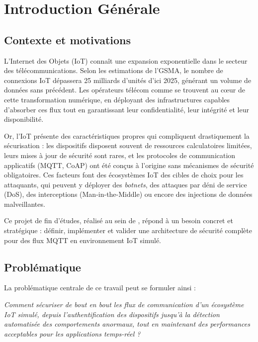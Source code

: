 \chapter{Introduction Générale}

\section{Contexte et motivations}

L'Internet des Objets (IoT) connaît une expansion exponentielle dans le secteur des télécommunications. Selon les estimations de l'GSMA, le nombre de connexions IoT dépassera 25 milliards d'unités d'ici 2025, générant un volume de données sans précédent. Les opérateurs télécom comme \TT{} se trouvent au cœur de cette transformation numérique, en déployant des infrastructures capables d'absorber ces flux tout en garantissant leur confidentialité, leur intégrité et leur disponibilité.

Or, l'IoT présente des caractéristiques propres qui compliquent drastiquement la sécurisation : les dispositifs disposent souvent de ressources calculatoires limitées, leurs mises à jour de sécurité sont rares, et les protocoles de communication applicatifs (MQTT, CoAP) ont été conçus à l'origine sans mécanismes de sécurité obligatoires. Ces facteurs font des écosystèmes IoT des cibles de choix pour les attaquants, qui peuvent y déployer des \textit{botnets}, des attaques par déni de service (\ac{DoS}), des interceptions (Man-in-the-Middle) ou encore des injections de données malveillantes.

Ce projet de fin d'études, réalisé au sein de \TT{}, répond à un besoin concret et stratégique : définir, implémenter et valider une architecture de sécurité complète pour des flux MQTT en environnement IoT simulé.

\section{Problématique}

La problématique centrale de ce travail peut se formuler ainsi :

\begin{tcolorbox}[colback=blue!5, colframe=blue!50!black, title=Problématique]
\textit{Comment sécuriser de bout en bout les flux de communication d'un écosystème IoT simulé, depuis l'authentification des dispositifs jusqu'à la détection automatisée des comportements anormaux, tout en maintenant des performances acceptables pour les applications temps-réel ?}
\end{tcolorbox}

